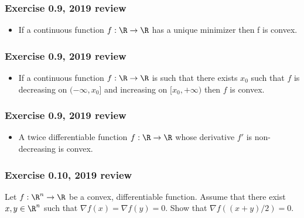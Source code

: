 \documentclass{beamer}
\begin{document}
\begin{frame}[t]
\frametitle{Exercise 0.9, 2019 review}
\vspace{-5pt}
\begin{itemize}
\item If a continuous function $f : \R \rightarrow \R$ has a unique minimizer then f is convex.
\end{itemize}
\end{frame}

\begin{frame}[t]
\frametitle{Exercise 0.9, 2019 review}
\vspace{-5pt}
\begin{itemize}
\item If a continuous function $f : \R \rightarrow \R$ is such that there exists $x_0$ such that $f$ is decreasing on
$(-\infty, x_0]$ and increasing on $[x_0, +\infty)$ then $f$ is convex.
\end{itemize}
\end{frame}

\begin{frame}[t]
\frametitle{Exercise 0.9, 2019 review}
\vspace{-5pt}
\begin{itemize}
\item A twice differentiable function $f : \R \rightarrow \R$ whose derivative $f'$ is non-decreasing is convex.
\end{itemize}
\end{frame}

\begin{frame}[t]
\frametitle{Exercise 0.10, 2019 review}
\vspace{-5pt}
Let $f : \R^n \rightarrow \R$ be a convex, differentiable function. Assume that there exist $x,y \in \R^n$ such that $\nabla f(x) = \nabla f(y) = 0$. Show that $\nabla f((x+y)/2) = 0$.
\end{frame}

\begin{frame}[t]
\pause
\pause
\pause
\pause
\end{frame}
\end{document}
